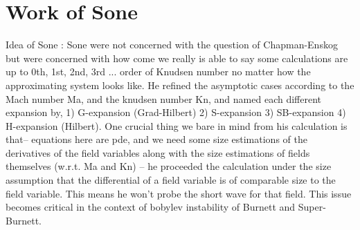 \documentclass[a4paper,12pt]{article}
\begin{document}
\section{Work of Sone}
Idea of Sone : Sone were not concerned with the question of Chapman-Enskog but were concerned with how come we really is able to say some calculations are up to 0th, 1st, 2nd, 3rd ... order of Knudsen number no matter how the approximating system looks like. He refined the asymptotic cases according to the Mach number Ma, and the knudsen number Kn, and named each different expansion by, 1) G-expansion (Grad-Hilbert) 2) S-expansion 3) SB-expansion 4) H-expansion (Hilbert). One crucial thing we bare in mind from his calculation is that-- equations here are pde, and we need some size estimations of the derivatives of the field variables along with the size estimations of fields themselves (w.r.t. Ma and Kn) -- he proceeded the calculation under the size assumption that the differential of a field variable is of comparable size to the field variable. This means he won't probe the short wave for that field. This issue becomes critical in the context of bobylev instability of Burnett and Super-Burnett.
\end{document}
